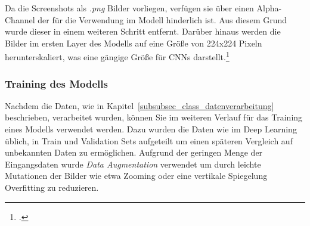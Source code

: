 Da die Screenshots als \textit{.png} Bilder vorliegen, verfügen sie über einen Alpha-Channel der für die Verwendung im Modell hinderlich ist.
Aus diesem Grund wurde dieser in einem weiteren Schritt entfernt.
Darüber hinaus werden die Bilder im ersten Layer des Modells auf eine Größe von 224x224 Pixeln herunterskaliert, was eine gängige Größe für \aclp{CNN} darstellt.\footcite[\vglf][]{ghosh2019}


\subsubsection{Training des Modells}\label{subsubsec_class_training}
Nachdem die Daten, wie in Kapitel~\ref{subsubsec_class_datenverarbeitung} beschrieben, verarbeitet wurden, können Sie im weiteren Verlauf für das Training eines Modells verwendet werden.
Dazu wurden die Daten wie im Deep Learning üblich, in Train und Validation Sets aufgeteilt um einen späteren Vergleich auf unbekannten Daten zu ermöglichen.
Aufgrund der geringen Menge der Eingangsdaten wurde \textit{Data Augmentation} verwendet um durch leichte Mutationen der Bilder wie etwa Zooming oder eine vertikale Spiegelung Overfitting zu reduzieren.
